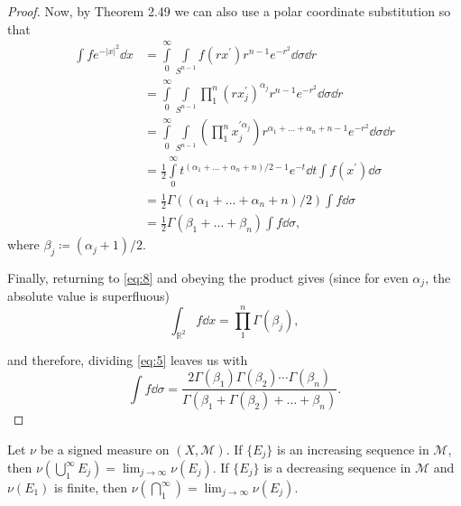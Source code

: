 \documentclass[11pt]{article}
\begin{document}
\begin{proof}
Now, by Theorem 2.49 we can also use a polar coordinate substitution so that
\begin{equation}
\label{eq:5}
\begin{aligned}
  \int f e^{-|x|^2} \dd{x} &= \int\limits_0^{\infty} \int\limits_{S^{n-1}} f(r x^{\prime}) r^{n-1} e^{-r^2} \dd{\sigma} \dd{r} \\
                        &= \int\limits_0^{\infty} \int\limits_{S^{n-1}} \prod_1^{n}(r x_j^{\prime})^{\alpha_j} r^{n-1} e^{-r^2} \dd{\sigma} \dd{r} \\
                        &= \int\limits_0^{\infty} \int\limits_{S^{n-1}} \left( \prod_1^n x^{\prime \alpha_j}_j \right) r^{\alpha_1 + \dots + \alpha_n + n - 1} e^{-r^2} \dd{\sigma} \dd{r} \\
                        &= \frac{1}{2} \int\limits_0^{\infty} t^{(\alpha_1 + \dots + \alpha_n + n)/2 - 1} e^{-t} \dd{t} \int f(x^{\prime}) \dd{\sigma} \\
                        &= \frac{1}{2} \Gamma((\alpha_1 + \dots + \alpha_n + n)/2) \int f \dd{\sigma} \\
                        &= \frac{1}{2} \Gamma(\beta_1 + \dots + \beta_n) \int f \dd{\sigma},
\end{aligned}
\end{equation}
where \( \beta_j \coloneq (\alpha_j + 1)/2 \).

Finally, returning to \cref{eq:8} and obeying the product gives (since for even \(\alpha_j\), the absolute value is superfluous)
\begin{equation}
\label{eq:10}
\int_{\mathbb{R}^2} f \dd{x} = \prod_1^n \Gamma(\beta_j),
\end{equation}

and therefore, dividing \cref{eq:5} leaves us with
\begin{equation}
\label{eq:11}
\int f \dd{\sigma} = \frac{2\Gamma(\beta_{1})\Gamma(\beta_2) \cdots \Gamma(\beta_n)}{\Gamma(\beta_1 + \Gamma(\beta_2) + \dots + \beta_{n})}.
\end{equation}
\end{proof}

\begin{prop}
  Let \(\nu\) be a signed measure on \( (X, \mathcal{M}) \).
  If \( \{E_j\} \) is an increasing sequence in \( \mathcal{M} \), then \( \nu(\bigcup_1^{\infty} E_j) = \lim_{j\rightarrow \infty} \nu(E_j)\).
  If \( \{E_j\} \) is a decreasing sequence in \( \mathcal{M} \) and \( \nu(E_1) \) is finite, then \( \nu(\bigcap_1^{\infty}) = \lim_{j\rightarrow\infty} \nu(E_j) \).
\end{prop}
\end{document}
